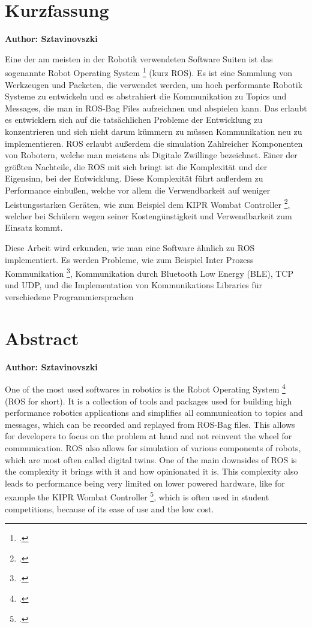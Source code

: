 \chapter{Kurzfassung}

\textbf{Author: Sztavinovszki}

\vspace{10mm}

Eine der am meisten in der Robotik verwendeten Software Suiten ist das sogenannte Robot Operating System \footcite{ros-site} (kurz ROS).
Es ist eine Sammlung von Werkzeugen und Packeten, die verwendet werden, um hoch performante Robotik Systeme zu entwickeln und es abstrahiert
die Kommunikation zu Topics und Messages, die man in ROS-Bag Files aufzeichnen und abspielen kann. Das erlaubt es entwicklern sich auf die tatsächlichen Probleme der Entwicklung zu konzentrieren und sich nicht darum kümmern zu müssen Kommunikation neu zu implementieren.
ROS erlaubt außerdem die simulation Zahlreicher Komponenten von Robotern, welche man meistens als Digitale Zwillinge bezeichnet.
Einer der größten Nachteile, die ROS mit sich bringt ist die Komplexität und der Eigensinn, bei der Entwicklung. Diese Komplexität führt außerdem zu Performance einbußen, welche vor allem die Verwendbarkeit auf weniger Leistungsstarken Geräten, wie zum Beispiel dem KIPR Wombat Controller \footcite{wombat-controller}, welcher bei Schülern wegen seiner Kostengünstigkeit und Verwendbarkeit zum Einsatz kommt.

\medskip

Diese Arbeit wird erkunden, wie man eine Software ähnlich zu ROS implementiert. Es werden Probleme, wie zum Beispiel Inter Prozess Kommunikation \footcite{ipc-begriff}, Kommunikation durch Bluetooth Low Energy (BLE), TCP und UDP, und die Implementation von Kommunikations Libraries für verschiedene Programmiersprachen


\chapter{Abstract}

\textbf{Author: Sztavinovszki}

\vspace{10mm}

One of the most used softwares in robotics is the Robot Operating System \footcite{ros-site} (ROS for short).
It is a collection of tools and packages used for building high performance robotics applications and
simplifies all communication to topics and messages, which can be recorded and replayed from ROS-Bag files.
This allows for developers to focus on the problem at hand and not reinvent the wheel for communication.
ROS also allows for simulation of various components of robots, which are most often called digital twins.
One of the main downsides of ROS is the complexity it brings with it and how opinionated it is. This complexity also leads to performance
being very limited on lower powered hardware, like for example the KIPR Wombat Controller \footcite{wombat-controller},
which is often used in student competitions, because of its ease of use and the low cost.

